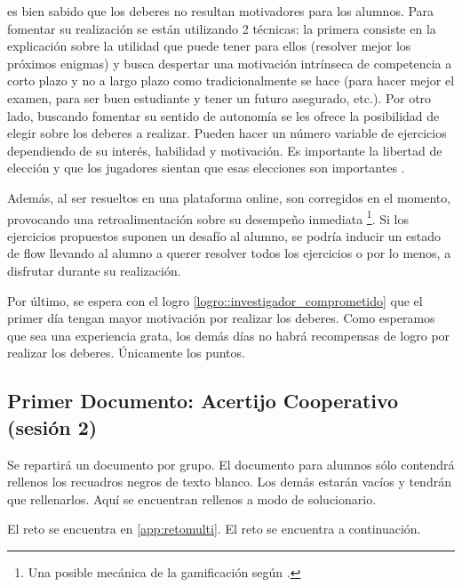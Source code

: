 	es bien sabido que los deberes no resultan motivadores para los alumnos. 
	Para fomentar su realización se están utilizando 2 técnicas: 
	la primera consiste en la explicación sobre la utilidad que puede tener para ellos (resolver mejor los próximos enigmas) y busca despertar una motivación intrínseca de competencia a corto plazo y no a largo plazo como tradicionalmente se hace (para hacer mejor el examen, para ser buen estudiante y tener un futuro asegurado, etc.).
	Por otro lado, buscando fomentar su sentido de autonomía se les ofrece la posibilidad de elegir sobre los deberes a realizar. 
	Pueden hacer un número variable de ejercicios dependiendo de su interés, habilidad y motivación.
	Es importante la libertad de elección y que los jugadores sientan que esas elecciones son importantes \citep{werbach2012win}.

	Además, al ser resueltos en una plataforma online, son corregidos en el momento, provocando una retroalimentación sobre su desempeño inmediata
	\footnote{Una posible mecánica de la gamificación según \citeauthor{werbach2012win}.}.
	Si los ejercicios propuestos suponen un desafío al alumno, se podría inducir un estado de flow llevando al alumno a querer resolver todos los ejercicios o por lo menos, a disfrutar durante su realización.

	Por último, se espera con el logro \ref{logro::investigador_comprometido} que el primer día tengan mayor motivación por realizar los deberes.
	Como esperamos que sea una experiencia grata, los demás días no habrá recompensas de logro por realizar los deberes. 
	Únicamente los puntos.


\subsection{Primer Documento: Acertijo Cooperativo (sesión 2)}
\label{app:ses2:coop}

Se repartirá un documento por grupo. 
%
El documento para alumnos sólo contendrá rellenos los recuadros negros de texto blanco.
%
Los demás estarán vacíos y tendrán que rellenarlos.
%
Aquí se encuentran rellenos a modo de solucionario.

\ifinapp
	El reto se encuentra en \ref{app:retomulti}.
\else 
	El reto se encuentra a continuación.
	
\fi




